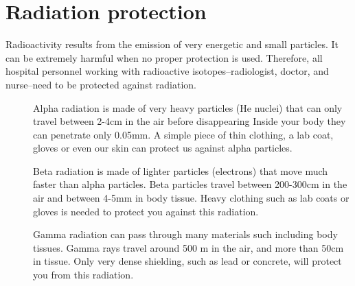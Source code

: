 \documentclass[main.tex]{subfiles}
\begin{document}
\section{Radiation protection}
Radioactivity results from the emission of very energetic and small particles. It can be extremely harmful when no proper protection is used. Therefore, all hospital personnel working with radioactive isotopes--radiologist, doctor, and nurse--need to be protected against radiation. 
\sloppy 
\begin{description}
\item[] Alpha radiation is made of very heavy particles (He nuclei) that can only travel between 2-4cm in the air before disappearing Inside your body they can penetrate only 0.05mm. A simple piece of thin clothing, a lab coat, gloves or even our skin can protect us against alpha particles. 
\item[] Beta radiation is made of lighter particles (electrons) that move much faster than alpha particles. Beta particles travel between 200-300cm in the air and between 4-5mm in body tissue. Heavy clothing such as lab coats or gloves is needed to protect you against this radiation.
\item[] Gamma radiation can pass through many materials such including body tissues. Gamma rays travel around 500 m in the air, and more than 50cm in tissue. Only very dense shielding, such as lead or concrete, will protect you from this radiation. 



\end{description}
\end{document}
